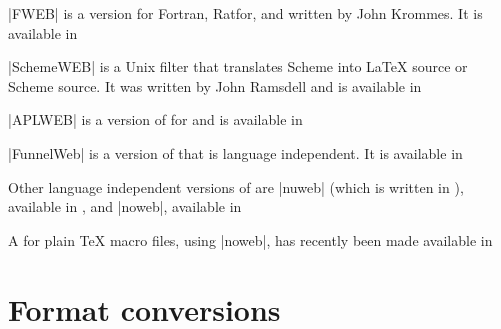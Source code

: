 \ProgName|FWEB| is a version for Fortran, Ratfor, and  written by John
Krommes.  %
It is available in 

\ProgName|SchemeWEB| is a Unix filter that translates Scheme into \LaTeX{}
source or Scheme source. It was written by John Ramsdell and is
available in 

\ProgName|APLWEB| is a version of  for  and is available in

\ProgName|FunnelWeb| is a version of  that is language independent. It is
available in 

Other language independent versions of  are \ProgName|nuweb| (which
is written in  ), available in , and
\ProgName|noweb|, available in 

A  for plain \TeX{} macro files, using \ProgName|noweb|, has
recently been made available in 


\section{Format conversions}


